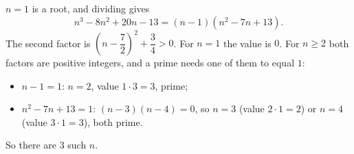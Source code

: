 $n=1$ is a root, and dividing gives
\[n^3-8n^2+20n-13=(n-1)(n^2-7n+13).\]
The second factor is $\left(n-\dfrac72\right)^2+\dfrac34>0$. For $n=1$ the value is $0$. For $n\ge2$ both factors are positive integers, and a prime needs one of them to equal $1$:
\begin{itemize}
\item $n-1=1$: $n=2$, value $1\cdot3=3$, prime;
\item $n^2-7n+13=1$: $(n-3)(n-4)=0$, so $n=3$ (value $2\cdot1=2$) or $n=4$ (value $3\cdot1=3$), both prime.
\end{itemize}
So there are $\boxed{3}$ such $n$.
